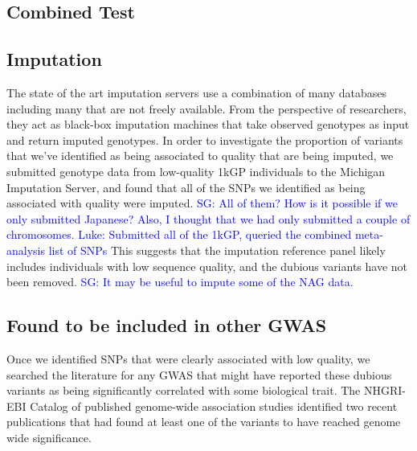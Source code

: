 \documentclass[9pt,lineno]{elife}
\newcommand{\sgcomment}[1]{\textcolor{blue}{SG: #1}}
\newcommand{\luke}[1]{\textcolor{blue}{Luke: #1}}
\begin{document}
\subsection{Combined Test}

\subsection{Imputation}
The state of the art imputation servers use a combination of many databases including many that are not freely available.
From the perspective of researchers, they act as black-box imputation machines that take observed genotypes as input and return imputed genotypes.  
In order to investigate the proportion of variants that we've identified as being associated to quality that are being imputed, we submitted genotype data from low-quality 1kGP individuals to the Michigan Imputation Server, and found that all of the SNPs we identified as being associated with quality were imputed. 
\sgcomment{All of them? How is it possible if we only submitted Japanese? Also, I thought that we had only submitted a couple of chromosomes.} 
\luke{Submitted all of the 1kGP, queried the combined meta-analysis list of SNPs}
This suggests that the imputation reference panel likely includes individuals with low sequence quality, and the dubious variants have not been removed. \sgcomment{It may be useful to impute some of the NAG data.} 


\subsection{Found to be included in other GWAS }
Once we identified SNPs that were clearly associated with low quality, we searched the literature for any GWAS that might have reported these dubious variants as being significantly correlated with some biological trait. 
The NHGRI-EBI Catalog of published genome-wide association studies identified two recent publications that had found at least one of the variants to have reached genome wide significance.
\end{document}
